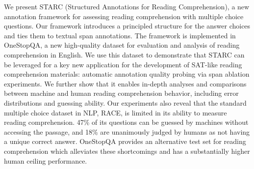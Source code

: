 We present STARC (Structured Annotations for Reading Comprehension), a new annotation framework for assessing reading comprehension with multiple choice questions. Our framework introduces a principled structure for the answer choices and ties them to textual span annotations. The framework is implemented in OneStopQA, a new high-quality dataset for evaluation and analysis of reading comprehension in English. We use this dataset to demonstrate that STARC can be leveraged for a key new application for the development of SAT-like reading comprehension materials: automatic annotation quality probing via span ablation experiments. We further show that it enables in-depth analyses and comparisons between machine and human reading comprehension behavior, including error distributions and guessing ability. Our experiments also reveal that the standard multiple choice dataset in NLP, RACE, is limited in its ability to measure reading comprehension. 47\% of its questions can be guessed by machines without accessing the passage, and 18\% are unanimously judged by humans as not having a unique correct answer. OneStopQA provides an alternative test set for reading comprehension which alleviates these shortcomings and has a substantially higher human ceiling performance.
